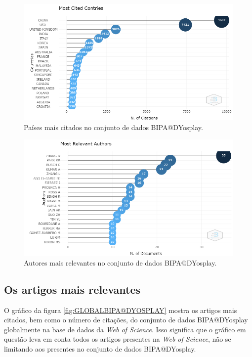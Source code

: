 \begin{figure}[H]
    \centering
    \includegraphics[width=1\textwidth]{experiments/DYosplay/PesquisaBibliometrica/Imagens/BIPA@DYosplay_MostRelevantCountries.png}
    \caption{Países mais citados no conjunto de dados BIPA@DYosplay.}
    \label{fig:MostRelevantCountriesBIPA@DYosplay}
\end{figure}

\begin{figure}[H]
    \centering
    \includegraphics[width=1\textwidth]{experiments/DYosplay/PesquisaBibliometrica/Imagens/BIPA@DYosplay_MostRelevantAu.png}
    \caption{Autores mais relevantes no conjunto de dados BIPA@DYosplay.}
    \label{fig:MostRelevantAuBIPA@DYosplay}
\end{figure}

\subsection{Os artigos mais relevantes}
\label{sec:BIPA@DYosplayArtigosMaisRelevantes}

O gráfico da figura \ref{fig:GLOBALBIPA@DYOSPLAY} mostra os artigos mais citados, bem como o número de citações, do conjunto de dados BIPA@DYosplay globalmente na base de dados da \textit{Web of Science}. Isso significa que o gráfico em questão leva em conta todos os artigos presentes na \textit{Web of Science}, não se limitando aos presentes no conjunto de dados BIPA@DYosplay.

